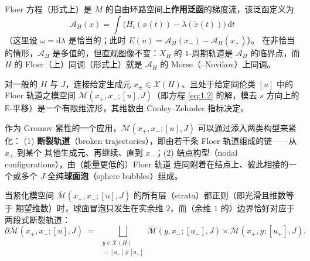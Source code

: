 \documentclass[UTF8,a4paper,11pt,fontset=windows]{ctexart}
\theoremstyle{cnthm}
\numberwithin{equation}{section}
\newcommand{\R}{\mathbb{R}}
\begin{document}
Floer 方程（形式上）是 $M$ 的自由环路空间上\textbf{作用泛函}的梯度流，该泛函定义为
\begin{equation}\label{eq:1.3}
\mathcal{A}_H(x)=\int\bigl(H_t(x(t))-\lambda(\dot x(t))\bigr)\,\mathrm{d}t
\end{equation}
（这里设 $\omega=\mathrm{d}\lambda$ 是恰当的；此时 $E(u)=\mathcal{A}_H(x_-)-\mathcal{A}_H(x_+)$）。
在非恰当的情形，$\mathcal{A}_H$ 是多值的，但直观图像不变：$X_H$ 的 $1$-周期轨道是
$\mathcal{A}_H$ 的临界点，而 $H$ 的 Floer（上）同调（形式上）就是 $\mathcal{A}_H$ 的
Morse（--Novikov）上同调。


对一般的 $H$ 与 $J$，连接给定生成元 $x_{\pm}\in\mathcal{X}(H)$、且处于给定同伦类 $[u]$ 中的
Floer 轨道之模空间 $\mathcal{M}(x_+,x_-;[u],J)$（即方程 \eqref{eq:1.2} 的解，模去 $s$ 方向上的
$\R$-平移）是一个有限维流形，其维数由 Conley--Zehnder 指标决定。

作为 Gromov 紧性的一个应用，$\mathcal{M}(x_+,x_-;[u],J)$ 可以通过添入两类构型来紧化：
(1) \textbf{断裂轨道}（broken trajectories），即由若干条 Floer 轨道组成的链——从 $x_+$ 到某个
其他生成元、再继续、直到 $x_-$；(2) 结点构型（nodal configurations），由（能量更低的）Floer 轨道
连同附着在结点上、彼此相接的一个或多个 $J$-全纯\textbf{球面泡}（sphere bubbles）组成。

当紧化模空间 $\overline{\mathcal{M}}(x_+,x_-;[u],J)$ 的所有层（strata）都正则（即光滑且维数等于
期望维数）时，球面冒泡只发生在实余维 $2$，而（余维 $1$ 的）边界恰好对应于两段式断裂轨道：
\begin{equation}\label{eq:1.4}
\partial\overline{\mathcal{M}}(x_+,x_-;[u],J)
\;=\;\bigsqcup_{\substack{y\in\mathcal{X}(H)\\ [u]=[u_-]\#[u_+]}}
\overline{\mathcal{M}}(y,x_-;[u_-],J)\times\overline{\mathcal{M}}(x_+,y;[u_+],J).
\end{equation}
\end{document}
